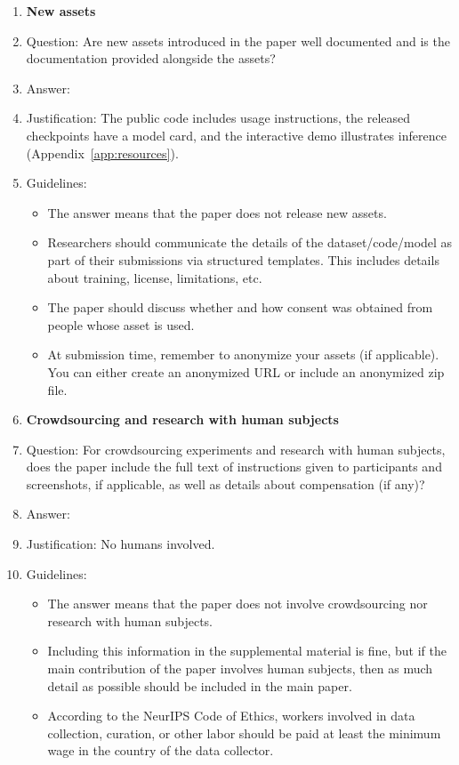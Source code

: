 \documentclass{article}
\theoremstyle{plain}
\theoremstyle{definition}
\theoremstyle{remark}
\begin{document}
\begin{enumerate}
\item {\bf New assets}
    \item[] Question: Are new assets introduced in the paper well documented and is the documentation provided alongside the assets?
    \item[] Answer: \answerYes{} %
    \item[] Justification: The public code includes usage instructions, the released checkpoints have a model card, and the interactive demo illustrates inference (Appendix~\ref{app:resources}).
    \item[] Guidelines:
    \begin{itemize}
        \item The answer \answerNA{} means that the paper does not release new assets.
        \item Researchers should communicate the details of the dataset\slash code\slash model as part of their submissions via structured templates. This includes details about training, license, limitations, etc. 
        \item The paper should discuss whether and how consent was obtained from people whose asset is used.
        \item At submission time, remember to anonymize your assets (if applicable). You can either create an anonymized URL or include an anonymized zip file.
    \end{itemize}

\item {\bf Crowdsourcing and research with human subjects}
    \item[] Question: For crowdsourcing experiments and research with human subjects, does the paper include the full text of instructions given to participants and screenshots, if applicable, as well as details about compensation (if any)? 
    \item[] Answer: \answerNA{} %
    \item[] Justification: No humans involved.
    \item[] Guidelines:
    \begin{itemize}
        \item The answer \answerNA{} means that the paper does not involve crowdsourcing nor research with human subjects.
        \item Including this information in the supplemental material is fine, but if the main contribution of the paper involves human subjects, then as much detail as possible should be included in the main paper. 
        \item According to the NeurIPS Code of Ethics, workers involved in data collection, curation, or other labor should be paid at least the minimum wage in the country of the data collector. 
    \end{itemize}


\end{enumerate}
\end{document}
